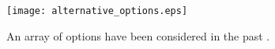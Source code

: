 \begin{figure}[htbp!]
  \begin{center}
    \texttt{[image: alternative\_options.eps]}
  \end{center}
  \caption{An array of options have been considered in the past 
    \cite{peters_what_2013}.}
  \label{fig:alternative_options}
\end{figure}
